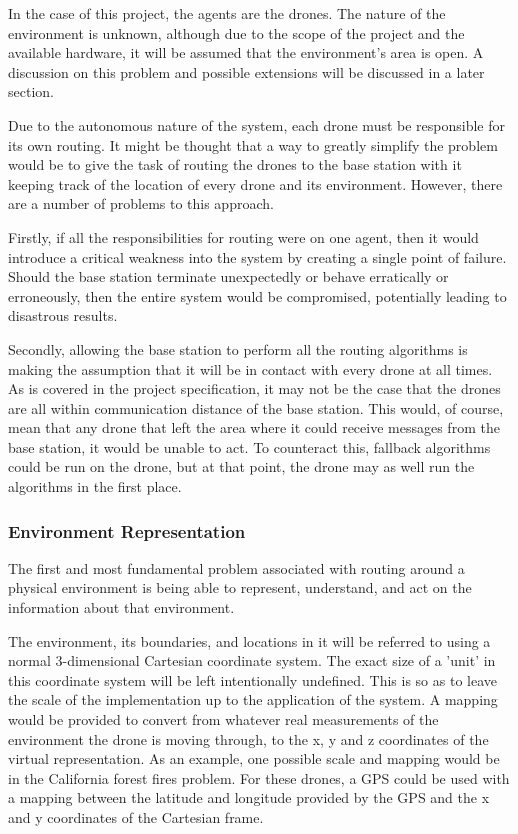 In the case of this project, the agents are the drones. The nature of the environment is unknown, although due to the scope of the project and the available hardware, it will be assumed that the environment's area is open. A discussion on this problem and possible extensions will be discussed in a later section.

Due to the autonomous nature of the system, each drone must be responsible for its own routing. It might be thought that a way to greatly simplify the problem would be to give the task of routing the drones to the base station with it keeping track of the location of every drone and its environment. However, there are a number of problems to this approach.

Firstly, if all the responsibilities for routing were on one agent, then it would introduce a critical weakness into the system by creating a single point of failure. Should the base station terminate unexpectedly or behave erratically or erroneously, then the entire system would be compromised, potentially leading to disastrous results.

Secondly, allowing the base station to perform all the routing algorithms is making the assumption that it will be in contact with every drone at all times. As is covered in the project specification, it may not be the case that the drones are all within communication distance of the base station. This would, of course, mean that any drone that left the area where it could receive messages from the base station, it would be unable to act. To counteract this, fallback algorithms could be run on the drone, but at that point, the drone may as well run the algorithms in the first place.

\subsubsection{Environment Representation}
		
The first and most fundamental problem associated with routing around a physical environment is being able to represent, understand, and act on the information about that environment.

The environment, its boundaries, and locations in it will be referred to using a normal 3-dimensional Cartesian coordinate system. The exact size of a 'unit' in this coordinate system will be left intentionally undefined. This is so as to leave the scale of the implementation up to the application of the system. A mapping would be provided to convert from whatever real measurements of the environment the drone is moving through, to the x, y and z coordinates of the virtual representation. As an example, one possible scale and mapping would be in the California forest fires problem. For these drones, a GPS could be used with a mapping between the latitude and longitude provided by the GPS and the x and y coordinates of the Cartesian frame.

